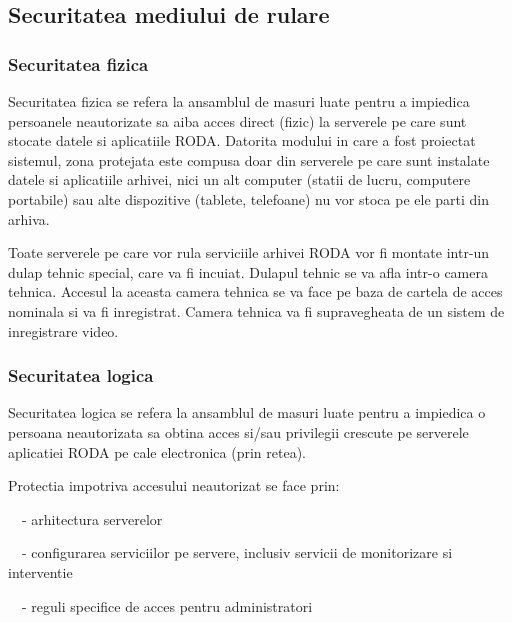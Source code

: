 \subsection{Securitatea mediului de rulare}
\label{securitatea_serverului}

\subsubsection{Securitatea fizica}

Securitatea fizica se refera la ansamblul de masuri luate pentru a impiedica persoanele neautorizate sa aiba acces
direct (fizic) la serverele pe care sunt stocate datele si aplicatiile RODA. Datorita modului in care a fost proiectat
sistemul, zona protejata este compusa doar din serverele pe care sunt instalate datele si aplicatiile arhivei, nici un
alt computer (statii de lucru, computere portabile) sau alte dispozitive (tablete, telefoane) nu vor stoca pe ele parti
din arhiva.

Toate serverele pe care vor rula serviciile arhivei RODA vor fi montate intr-un dulap tehnic special, care va fi
incuiat. Dulapul tehnic se va afla intr-o camera tehnica. Accesul la aceasta
camera tehnica se va face pe baza de cartela de acces nominala si va fi inregistrat.
Camera tehnica va fi supravegheata de un sistem de inregistrare video. 

\subsubsection{Securitatea logica}

Securitatea logica se refera la ansamblul de masuri luate pentru a impiedica o persoana neautorizata sa obtina acces
si/sau privilegii crescute pe serverele aplicatiei RODA pe cale electronica (prin retea).

Protectia impotriva accesului neautorizat se face prin:

{\sffamily\color{black}
\ \ {}- arhitectura serverelor}

{\sffamily\color{black}
\ \ {}- configurarea serviciilor pe servere, inclusiv servicii de monitorizare si interventie }

{\sffamily\color{black}
\ \ {}- reguli specifice de acces pentru administratori}

